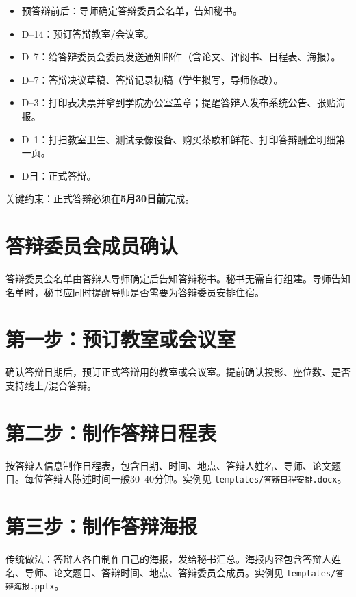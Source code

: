\documentclass[12pt,a4paper,openany]{ctexbook}
\begin{document}
\begin{itemize}
  \item 预答辩前后：导师确定答辩委员会名单，告知秘书。
  \item D--14：预订答辩教室/会议室。
  \item D--7：给答辩委员会委员发送通知邮件（含论文、评阅书、日程表、海报）。
  \item D--7：答辩决议草稿、答辩记录初稿（学生拟写，导师修改）。
  \item D--3：打印表决票并拿到学院办公室盖章；提醒答辩人发布系统公告、张贴海报。
  \item D--1：打扫教室卫生、测试录像设备、购买茶歇和鲜花、打印答辩酬金明细第一页。
  \item D日：正式答辩。
\end{itemize}

\begin{warnbox}
关键约束：正式答辩必须在\textbf{5月30日前}完成。
\end{warnbox}

\section{答辩委员会成员确认}

答辩委员会名单由答辩人导师确定后告知答辩秘书。秘书无需自行组建。导师告知名单时，秘书应同时提醒导师是否需要为答辩委员安排住宿。

\section{第一步：预订教室或会议室}

确认答辩日期后，预订正式答辩用的教室或会议室。提前确认投影、座位数、是否支持线上/混合答辩。

\section{第二步：制作答辩日程表}

按答辩人信息制作日程表，包含日期、时间、地点、答辩人姓名、导师、论文题目。每位答辩人陈述时间一般30--40分钟。实例见 \texttt{templates/答辩日程安排.docx}。

\section{第三步：制作答辩海报}

传统做法：答辩人各自制作自己的海报，发给秘书汇总。海报内容包含答辩人姓名、导师、论文题目、答辩时间、地点、答辩委员会成员。实例见 \texttt{templates/答辩海报.pptx}。
\end{document}
